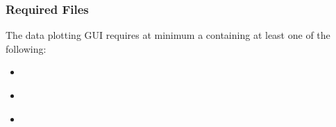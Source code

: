 \documentclass[letterpaper,10pt,english]{sphinxmanual}
\begin{document}
\subsubsection{Required Files}
\label{\detokenize{content/data_plot/getting_started:required-files}}
The data plotting GUI requires at minimum a {\hyperref[\detokenize{content/api_core/input_files:startup-file}]{}} containing at least one of the following:
\begin{itemize}
\item {} 
{\hyperref[\detokenize{content/api_core/input_files:list-file}]{}}

\item {} 
{\hyperref[\detokenize{content/api_core/input_files:data-file}]{}}

\item {} 
{\hyperref[\detokenize{content/api_core/input_files:response-file}]{}}

\end{itemize}
\end{document}
